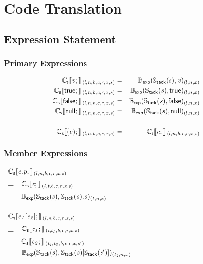\documentclass[a4j]{jsarticle}
\newcommand{\lb}{[\![}				%
\newcommand{\rb}{]\!]}				%
\newcommand{\db}[1]{\lb#1\rb}			%
\newcommand{\den}[2]{{#1}\db{#2}\,}
\newcommand{\defC}[3]{\den{#1}{\sf #2}_{\it #3}}
\newcommand{\Cs}{\defC{\mathbb{C}_{\sf s}}}
\newcommand{\Stack}[1]{\mathbb{S}_{\sf tack}(#1)}
\newcommand{\defB}[3]{{#1}({\sf #2})_{#3}}
\newcommand{\Bexp}{\defB{\mathbb{B}_{\sf exp}}}
\newcommand{\var}[1]{{\it #1}}
\begin{document}
\section{Code Translation}

\subsection{Expression Statement}

\subsubsection{Primary Expressions}

\begin{eqnarray*}
	\Cs{ \var{v}; }{(l, n, b, c, r, x, s)}       &  =  &   \Bexp{ \Stack{\var{s}}, \var{v} }{(l, n, x)}  \\
	\Cs{ true;    }{(l, n, b, c, r, x, s)}       &  =  &   \Bexp{ \Stack{\var{s}}, true    }{(l, n, x)}  \\
	\Cs{ false;   }{(l, n, b, c, r, x, s)}       &  =  &   \Bexp{ \Stack{\var{s}}, false   }{(l, n, x)}  \\
	\Cs{ null;    }{(l, n, b, c, r, x, s)}       &  =  &   \Bexp{ \Stack{\var{s}}, null    }{(l, n, x)}  \\
	...\\
	\Cs{ ( \var{e} ); }{(l, n, b, c, r, x, s)}   &  =  &   \Cs{ \var{e}; }{(l, n, b, c, r, x, s)}  \\
\end{eqnarray*}



\subsubsection{Member Expressions}

\begin{tabular}{ll}
	\multicolumn{2}{l}{
		$ \Cs{ \var{e}.\var{p}; }{(l, n, b, c, r, x, s)} $
	}  \\
	=  &  $ \Cs{ \var{e}; }{(l, t, b, c, r, x, s)}              $  \\
	   &  $ \Bexp{ \Stack{\var{s}}, \Stack{\var{s}}.\var{p} }{(t, n, x)}    $
\end{tabular}

\vspace{1em}

\begin{tabular}{ll}
	\multicolumn{2}{l}{
		$ \Cs{ \var{e_1}[\var{e_2}]; }{(l, n, b, c, r, x, s)} $
	}  \\
	=  &  $ \Cs{ \var{e_1}; }{(l, t_1, b, c, r, x, s)}                 $  \\
	   &  $ \Cs{ \var{e_2}; }{(t_1, t_2, b, c, r, x, s')}              $  \\
	   &  $ \Bexp{ \Stack{\var{s}}, \Stack{\var{s}}[\Stack{\var{s'}}] }{(t_2, n, x)}    $
\end{tabular}
\end{document}

